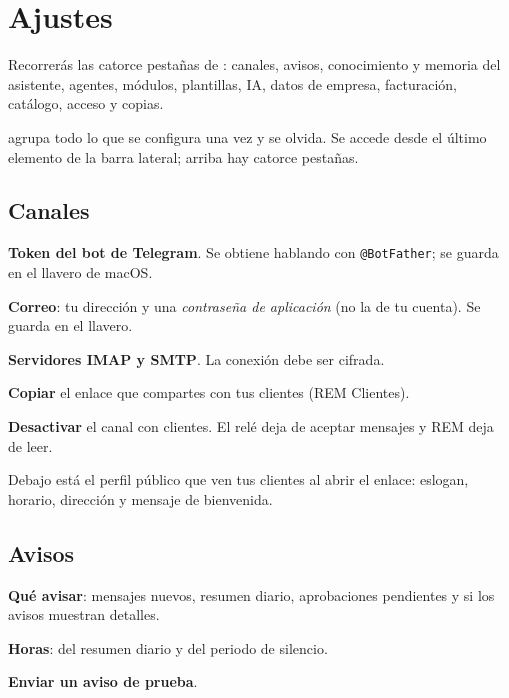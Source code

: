\chapter{Ajustes}\label{cap:ajustes}

\begin{objbox}
Recorrerás las catorce pestañas de : canales, avisos, conocimiento y memoria del asistente, agentes, módulos, plantillas, IA, datos de empresa, facturación, catálogo, acceso y copias.
\end{objbox}

 agrupa todo lo que se configura una vez y se olvida. Se accede desde el último elemento de la barra lateral; arriba hay catorce pestañas.

\section{Canales}
\begin{leyenda}
\item[\mk{1}] \textbf{Token del bot de Telegram}. Se obtiene hablando con \texttt{@BotFather}; se guarda en el llavero de macOS.
\item[\mk{2}] \textbf{Correo}: tu dirección y una \emph{contraseña de aplicación} (no la de tu cuenta). Se guarda en el llavero.
\item[\mk{3}] \textbf{Servidores IMAP y SMTP}. La conexión debe ser cifrada.
\item[\mk{4}] \textbf{Copiar} el enlace que compartes con tus clientes (REM Clientes).
\item[\mk{5}] \textbf{Desactivar} el canal con clientes. El relé deja de aceptar mensajes y REM deja de leer.
\end{leyenda}
Debajo está el perfil público que ven tus clientes al abrir el enlace: eslogan, horario, dirección y mensaje de bienvenida.

\section{Avisos}
\begin{leyenda}
\item[\mk{1}] \textbf{Qué avisar}: mensajes nuevos, resumen diario, aprobaciones pendientes y si los avisos muestran detalles.
\item[\mk{2}] \textbf{Horas}: del resumen diario y del periodo de silencio.
\item[\mk{3}] \textbf{Enviar un aviso de prueba}.
\end{leyenda}

